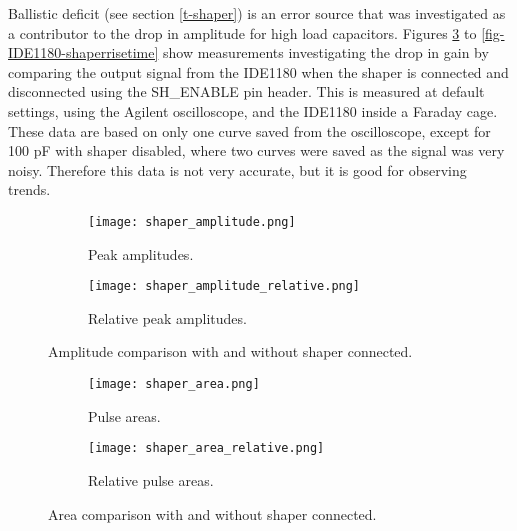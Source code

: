 \documentclass[../main/thesis.tex]{subfiles}
\begin{document}
Ballistic deficit (see section \ref{t-shaper}) is an error source that was investigated as a contributor to the drop in amplitude for high load capacitors. Figures \ref{fig-IDE1180-shaperamp} to \ref{fig-IDE1180-shaperrisetime} show measurements investigating the drop in gain by comparing the output signal from the IDE1180 when the shaper is connected and disconnected using the SH\_ENABLE pin header. This is measured at default settings, using the Agilent oscilloscope, and the IDE1180 inside a Faraday cage. These data are based on only one curve saved from the oscilloscope, except  for 100 pF with shaper disabled, where two curves were saved as the signal was very noisy. Therefore this data is not very accurate, but it is good for observing trends. 

\begin{figure}[p]
	\centering
	\begin{subfigure}{.5\textwidth}
		\centering
		\texttt{[image: shaper\_amplitude.png]}
		\caption{Peak amplitudes.}
		\label{fig-IDE1180-shaperamp-}
	\end{subfigure}%
	\begin{subfigure}{.5\textwidth}
		\centering
		\texttt{[image: shaper\_amplitude\_relative.png]}
		\caption{Relative peak amplitudes.}
		\label{fig-IDE1180-shaperamp-rel} 
	\end{subfigure}
	\caption{Amplitude comparison with and without shaper connected.}
	\label{fig-IDE1180-shaperamp}
\end{figure}

\begin{figure}[p]
	\centering
	\begin{subfigure}{.5\textwidth}
		\centering
		\texttt{[image: shaper\_area.png]}
		\caption{Pulse areas.}
		\label{fig-IDE1180-shaperarea-}
	\end{subfigure}%
	\begin{subfigure}{.5\textwidth}
		\centering
		\texttt{[image: shaper\_area\_relative.png]}
		\caption{Relative pulse areas.}
		\label{fig-IDE1180-shaperarea-rel} 
	\end{subfigure}
	\caption{Area comparison with and without shaper connected.}
	\label{fig-IDE1180-shaperarea}
\end{figure}
\end{document}
